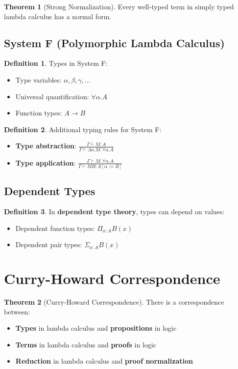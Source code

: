 \documentclass[11pt]{article}
\theoremstyle{definition}
\newtheorem{definition}{Definition}[section]
\newtheorem{theorem}{Theorem}[section]
\begin{document}
\begin{theorem}[Strong Normalization]
Every well-typed term in simply typed lambda calculus has a normal form.
\end{theorem}

\subsection{System F (Polymorphic Lambda Calculus)}
\begin{definition}
Types in System F:
\begin{itemize}
    \item Type variables: $\alpha, \beta, \gamma, \ldots$
    \item Universal quantification: $\forall \alpha. A$
    \item Function types: $A \to B$
\end{itemize}
\end{definition}

\begin{definition}
Additional typing rules for System F:
\begin{itemize}
    \item \textbf{Type abstraction}: $\frac{\Gamma \vdash M : A}{\Gamma \vdash \Lambda \alpha. M : \forall \alpha. A}$
    \item \textbf{Type application}: $\frac{\Gamma \vdash M : \forall \alpha. A}{\Gamma \vdash M B : A[\alpha := B]}$
\end{itemize}
\end{definition}

\subsection{Dependent Types}
\begin{definition}
In \textbf{dependent type theory}, types can depend on values:
\begin{itemize}
    \item Dependent function types: $\Pi_{x:A} B(x)$
    \item Dependent pair types: $\Sigma_{x:A} B(x)$
\end{itemize}
\end{definition}

\section{Curry-Howard Correspondence}

\begin{theorem}[Curry-Howard Correspondence]
There is a correspondence between:
\begin{itemize}
    \item \textbf{Types} in lambda calculus and \textbf{propositions} in logic
    \item \textbf{Terms} in lambda calculus and \textbf{proofs} in logic
    \item \textbf{Reduction} in lambda calculus and \textbf{proof normalization}
\end{itemize}
\end{theorem}
\end{document}
